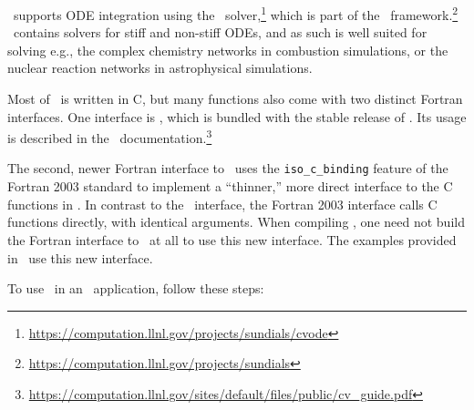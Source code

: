 \amrex\ supports ODE integration using the \cvode\ solver,\footnote{\url{https://computation.llnl.gov/projects/sundials/cvode}} which is part of the \sundials\ framework.\footnote{\url{https://computation.llnl.gov/projects/sundials}}
\cvode\ contains solvers for stiff and non-stiff ODEs, and as such is well suited for solving e.g., the complex chemistry networks in combustion simulations, or the nuclear reaction networks in astrophysical simulations.

Most of \cvode\ is written in C, but many functions also come with two distinct Fortran interfaces.
One interface is \fcvode, which is bundled with the stable release of \cvode.
Its usage is described in the \cvode\ documentation.\footnote{\url{https://computation.llnl.gov/sites/default/files/public/cv_guide.pdf}}

The second, newer Fortran interface to \cvode\ uses the \texttt{iso\_c\_binding} feature of the Fortran 2003 standard to implement a ``thinner,'' more direct interface to the C functions in \cvode.
In contrast to the \fcvode\ interface, the Fortran 2003 interface calls C functions directly, with identical arguments.
When compiling \cvode, one need not build the Fortran interface to \cvode\ at all to use this new interface.
The examples provided in \amrex\ use this new interface.

To use \cvode\ in an \amrex\ application, follow these steps:

